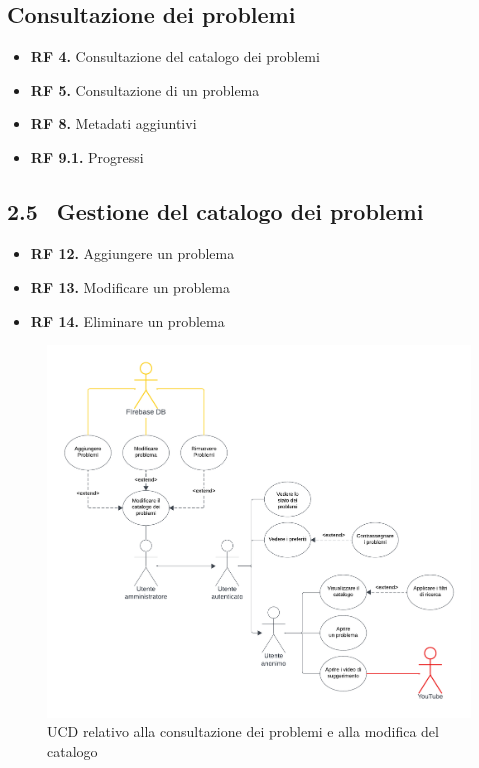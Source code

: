 \documentclass[11pt, a4paper]{article}
\theoremstyle{definition} %
\begin{document}
\newpage
\subsection{Consultazione dei problemi}
\begin{itemize}
    \item \textbf{RF 4.} Consultazione del catalogo dei problemi
    \item \textbf{RF 5.} Consultazione di un problema
    \item \textbf{RF 8.} Metadati aggiuntivi
    \item \textbf{RF 9.1.} Progressi
\end{itemize}
\subsection*{2.5\texttt{ }\textit{ } Gestione del catalogo dei problemi}
\begin{itemize}
    \item \textbf{RF 12.} Aggiungere un problema
    \item \textbf{RF 13.} Modificare un problema
    \item \textbf{RF 14.} Eliminare un problema
\end{itemize}

\begin{figure}[H]
\centering
\hspace*{-1cm}
\includegraphics[scale=0.57]{materiale/ucdiagrams/ucproblemi.pdf}
\caption{UCD relativo alla consultazione dei problemi e alla modifica del catalogo}
\end{figure}
\end{document}
